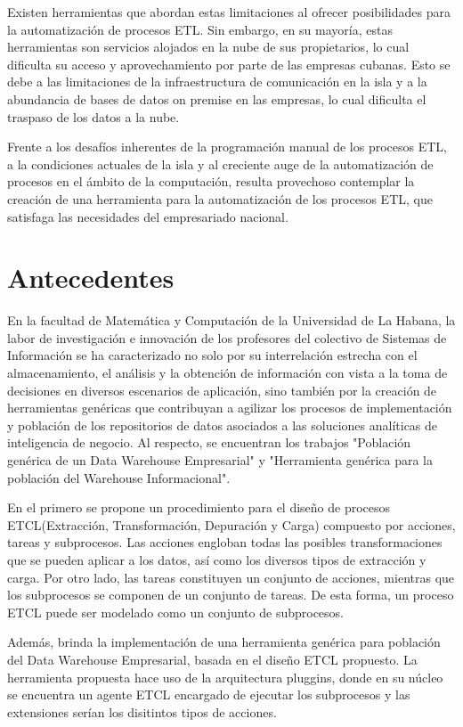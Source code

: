 Existen herramientas que abordan estas limitaciones al ofrecer posibilidades para la automatización de procesos ETL. 
Sin embargo, en su mayoría, estas herramientas son servicios alojados en la nube de sus propietarios, lo cual 
dificulta su acceso y aprovechamiento por parte de las empresas cubanas. Esto se debe a las limitaciones de la 
infraestructura de comunicación en la isla y a la abundancia de bases de datos on premise en las empresas, lo cual 
dificulta el traspaso de los datos a la nube.

Frente a los desafíos inherentes de la programaci\'on manual de los procesos ETL, a la condiciones actuales
de la isla y al creciente auge de la automatización de procesos en el ámbito de la computación, resulta 
provechoso contemplar la creación de una herramienta para la automatización de los procesos ETL, que satisfaga 
las necesidades del empresariado nacional.

\section{Antecedentes}

En la facultad de Matemática y Computación de la Universidad de La Habana, la labor de investigación e innovación de 
los profesores del colectivo de Sistemas de Información se ha caracterizado no solo por su interrelación estrecha 
con el almacenamiento, el análisis y la obtención de información con vista a la toma de decisiones en diversos 
escenarios de aplicación, sino también por la creación de herramientas genéricas que contribuyan a agilizar los 
procesos de implementación y población de los repositorios de datos asociados a las soluciones analíticas de 
inteligencia de negocio. Al respecto, se encuentran los trabajos "Población genérica
de un Data Warehouse Empresarial"\cite{mijailmaster} y "Herramienta genérica para la población del 
Warehouse Informacional"\cite{lismaster}.

En el primero se propone un procedimiento para el diseño de procesos ETCL(Extracci\'on, Transformaci\'on, Depuraci\'on y Carga) 
compuesto por acciones, tareas y subprocesos. Las acciones engloban todas las posibles transformaciones que se pueden 
aplicar a los datos, así como los diversos tipos de extracción y carga. Por otro lado, las tareas constituyen un 
conjunto de acciones, mientras que los subprocesos se componen de un conjunto de tareas. De esta forma, un proceso 
ETCL puede ser modelado como un conjunto de subprocesos.

Además, brinda la implementación de una herramienta genérica para población del Data Warehouse Empresarial, basada en el 
diseño ETCL propuesto. La herramienta propuesta hace uso de la arquitectura pluggins\cite{noauthor_plug-architectures_nodate}, 
donde en su n\'ucleo se encuentra 
un agente ETCL encargado de ejecutar los subprocesos y las extensiones ser\'ian los disitintos tipos de acciones.

